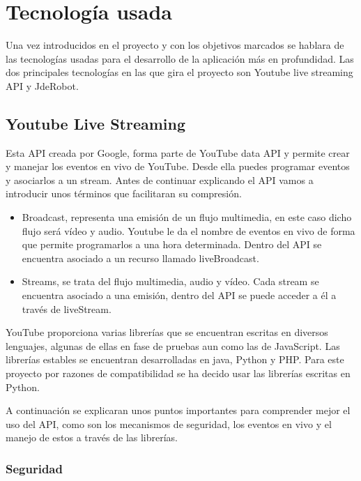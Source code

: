 \chapter{Tecnología usada}

Una vez introducidos en el proyecto y con los objetivos marcados se hablara de las tecnologías usadas para el desarrollo de la aplicación más en profundidad. Las dos principales tecnologías en las que gira el proyecto son Youtube live streaming API y JdeRobot.

\section{Youtube Live Streaming}

Esta API creada por Google, forma parte de YouTube data API y  permite crear y manejar los eventos en vivo de YouTube. Desde ella puedes programar eventos y asociarlos a un stream. Antes de continuar explicando el API vamos a introducir unos términos que facilitaran su compresión.

\begin{itemize}
    \item Broadcast, representa una emisión de un flujo multimedia, en este caso dicho flujo será vídeo y audio. Youtube le da el nombre de eventos en vivo de forma que permite programarlos a una hora determinada. Dentro del API se encuentra asociado a un recurso llamado liveBroadcast.
    \item Streams, se trata del flujo multimedia, audio y vídeo. Cada stream se encuentra asociado a una emisión, dentro del API se puede acceder a él a través de liveStream.
\end{itemize}

YouTube proporciona varias librerías que se encuentran escritas en diversos lenguajes, algunas de ellas en fase de pruebas aun como las de JavaScript. Las librerías estables se encuentran desarrolladas en java, Python  y PHP. Para este proyecto por razones de compatibilidad se ha decido usar las librerías escritas en Python.

A continuación se explicaran unos puntos importantes para comprender mejor el uso del API, como son los mecanismos de seguridad, los eventos en vivo y el manejo de estos a través de las librerías.

\subsection{Seguridad}

